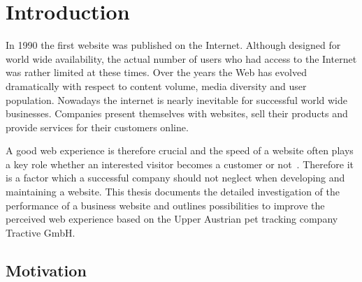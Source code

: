 \chapter{Introduction}
\label{sec:introduction}
In 1990 the first website was published on the Internet. Although designed for world wide availability, the actual number of users who  had access to the Internet was rather limited at these times. Over the years the Web has evolved dramatically with respect to content volume, media diversity and user population. Nowadays  the internet is nearly inevitable for successful world wide businesses. Companies present themselves with websites, sell their products and provide services for their customers online. 

A good web experience is therefore crucial and the speed of a website often plays a key role whether an interested visitor becomes a customer or not~\cite{menasce2000scaling}. 
Therefore it is a factor which a successful company should not neglect when developing and maintaining a website. This thesis documents the detailed investigation of the performance of a business website and outlines possibilities to improve the perceived web experience based on the Upper Austrian pet tracking company Tractive GmbH.  

\section{Motivation}

